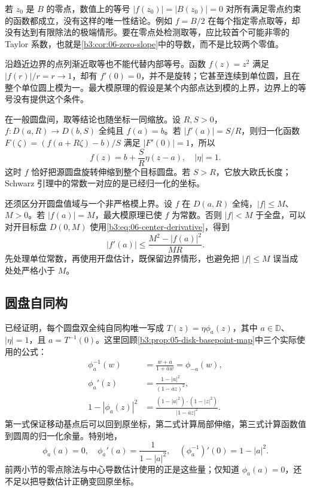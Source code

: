 \ProseParagraphBreak

若 \(z_0\) 是 \(B\) 的零点，数值上的等号 \(|f(z_0)|=|B(z_0)|=0\) 对所有满足零点约束的函数都成立，没有这样的唯一性结论。例如 \(f=B/2\) 在每个指定零点取等，却没有达到有限除法的极端情形。要在零点处检测取等，应比较首个可能非零的 Taylor 系数，也就是\cref{b3:cor:06-zero-slope}中的导数，而不是比较两个零值。

\ProseParagraphBreak

沿趋近边界的点列渐近取等也不能代替内部等号。函数 \(f(z)=z^2\) 满足 \(|f(r)|/r=r\to1\)，却有 \(f'(0)=0\)，并不是旋转；它甚至连续到单位圆，且在整个单位圆上模为一。最大模原理的假设是某个内部点达到模的上界，边界上的等号没有提供这个条件。

\ProseParagraphBreak

在一般圆盘间，取等结论也随坐标一同缩放。设 \(R,S>0\)，\(f:D(a,R)\to D(b,S)\) 全纯且 \(f(a)=b\)。若 \(|f'(a)|=S/R\)，则归一化函数 \(F(\zeta)=(f(a+R\zeta)-b)/S\) 满足 \(|F'(0)|=1\)，所以
\[
 f(z)=b+\frac SR\eta(z-a),\quad |\eta|=1.
\]
这时 \(f\) 恰好把源圆盘旋转伸缩到整个目标圆盘。若 \(S>R\)，它放大欧氏长度；Schwarz 引理中的常数一对应的是已经归一化的坐标。

\ProseParagraphBreak

还须区分开圆盘值域与一个非严格模上界。设 \(f\) 在 \(D(a,R)\) 全纯，\(|f|\le M\)、\(M>0\)。若 \(|f(a)|=M\)，最大模原理已使 \(f\) 为常数。否则 \(|f|<M\) 于全盘，可以对开目标盘 \(D(0,M)\) 使用\eqref{b3:eq:06-center-derivative}，得到
\[
 |f'(a)|\le\frac{M^2-|f(a)|^2}{MR}.
\]
先处理单位常数，再使用开盘估计，既保留边界情形，也避免把 \(|f|\le M\) 误当成处处严格小于 \(M\)。

\subsection{圆盘自同构}
\label{b3:subsec:060104}

已经证明，每个圆盘双全纯自同构唯一写成 \(T(z)=\eta\phi_a(z)\)，其中 \(a\in\mathbb D\)、\(|\eta|=1\)，且 \(a=T^{-1}(0)\)。这里回顾\cref{b3:prop:05-disk-basepoint-map}中三个实际使用的公式：
\[
 \begin{aligned}
 \phi_a^{-1}(w)&=\frac{w+a}{1+\overline a w}=\phi_{-a}(w),\\
 \phi_a'(z)&=\frac{1-|a|^2}{(1-\overline a z)^2},\\
 1-|\phi_a(z)|^2
 &=\frac{(1-|a|^2)\cdot(1-|z|^2)}{|1-\overline a z|^2}.
 \end{aligned}
\]
第一式保证移动基点后可以回到原坐标，第二式计算局部伸缩，第三式计算函数值到圆周的归一化余量。特别地，
\[
 \phi_a(a)=0,\quad \phi_a'(a)=\frac1{1-|a|^2},
 \quad (\phi_a^{-1})'(0)=1-|a|^2.
\]
前两小节的零点除法与中心导数估计使用的正是这些量；仅知道 \(\phi_a(a)=0\)，还不足以把导数估计正确变回原坐标。

